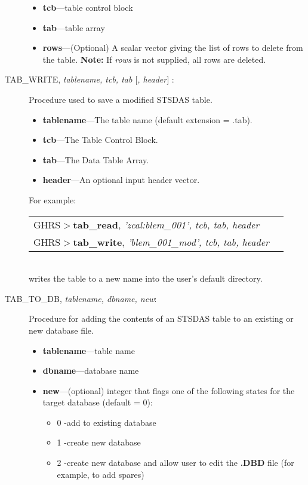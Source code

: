 \begin{description}
\begin{itemize}
\item	{\bf tcb}---table control block
\item	{\bf tab}---table array
\item	{\bf rows}---(Optional) A scalar vector giving the list of
rows to delete from the table.  {\bf Note:} If {\it rows} is not
supplied, all rows are deleted. 
\end{itemize}
%
\item [TAB\_WRITE, {\it tablename, tcb, tab $[$, header$]$} :] Procedure 
used to save a modified STSDAS table.

\begin{itemize}
\item {\bf tablename}---The table name (default extension = .tab).

\item {\bf tcb}---The Table Control Block.

\item {\bf tab}---The Data Table Array.

\item {\bf header}---An optional input header vector.
\end{itemize}

\noindent
For example:\\

\begin{tabular}{ll}
GHRS$>${\bf tab\_read}, {\it 'zcal:blem\_001', tcb, tab, header} & \\
GHRS$>${\bf tab\_write}, {\it 'blem\_001\_mod', tcb, tab, header} & \\
\end{tabular}\\

\noindent
writes the table to a new name into the user's default directory.
%
\item [TAB\_TO\_DB, {\it tablename, dbname, new}:]

Procedure for adding the contents of an STSDAS table to an existing or
new database file. 

\begin{itemize}
\item	{\bf tablename}---table name
\item	{\bf dbname}---database name
\item	{\bf new}---(optional) integer that flags one of the following states 
for the target database (default = 0):
\begin{itemize}
\item  0 -add 
to existing database 
\item  1 -create new database
\item 2 -create new database and allow user to edit the {\bf .DBD} file (for 
example, to add spares)
\end{itemize}
\end{itemize}
 

\end{description}
